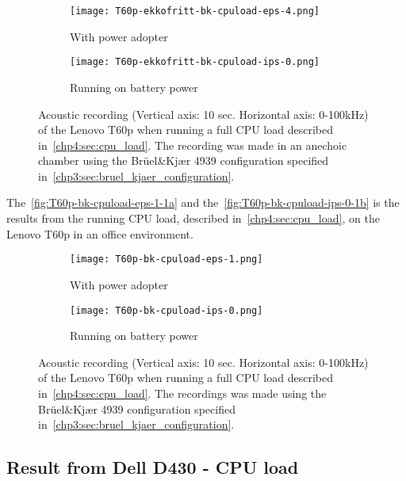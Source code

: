 \begin{figure}[ht]
	\begin{subfigure}{0.5\textwidth}
	    \centering
	    \texttt{[image: T60p-ekkofritt-bk-cpuload-eps-4.png]}
	    \caption{With power adopter}
	    \label{fig:T60p-ekkofritt-bk-cpuload-eps-4}
    \end{subfigure}
    \begin{subfigure}{0.5\textwidth}
	    \centering
	    \texttt{[image: T60p-ekkofritt-bk-cpuload-ips-0.png]}
	    \caption{Running on battery power}
	    \label{fig:T60p-ekkofritt-bk-cpuload-ips-0}
    \end{subfigure}
    \caption{Acoustic recording (Vertical axis: 10 sec. Horizontal axis: 0-100kHz) of the Lenovo T60p when running a full CPU load described in~\autoref{chp4:sec:cpu_load}. The recording was made in an anechoic chamber using the Brüel\&Kjær 4939 configuration specified in~\autoref{chp3:sec:bruel_kjaer_configuration}.}
	\label{fig:T60p-ekkofritt-bk-cpuload}
\end{figure}
The~\autoref{fig:T60p-bk-cpuload-eps-1-1a} and the~\autoref{fig:T60p-bk-cpuload-ips-0-1b} is the results from the running CPU load, described in~\autoref{chp4:sec:cpu_load}, on the Lenovo T60p in an office environment. 
\begin{figure}[ht]
	\begin{subfigure}{0.5\textwidth}
	    \centering
	    \texttt{[image: T60p-bk-cpuload-eps-1.png]}
	    \caption{With power adopter}
	    \label{fig:T60p-bk-cpuload-eps-1-1a}
    \end{subfigure}
    \begin{subfigure}{0.5\textwidth}
	    \centering
	    \texttt{[image: T60p-bk-cpuload-ips-0.png]}
	    \caption{Running on battery power}
	    \label{fig:T60p-bk-cpuload-ips-0-1b}
    \end{subfigure}
    \caption{Acoustic recording (Vertical axis: 10 sec. Horizontal axis: 0-100kHz) of the Lenovo T60p when running a full CPU load described in~\autoref{chp4:sec:cpu_load}. The recordings was made using the Brüel\&Kjær 4939 configuration specified in~\autoref{chp3:sec:bruel_kjaer_configuration}. }
	\label{fig:T60p-bk-cpuload}
\end{figure}


\subsection{Result from Dell D430 - CPU load}\label{chp5:subsec:d430_bk_results_cpuload}

